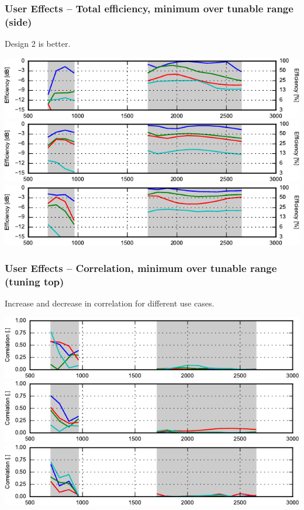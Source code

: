 \begin{frame}
    \frametitle{User Effects -- Total efficiency, minimum over tunable range (side)}
    Design 2 is better.
    \begin{center}
        \includegraphics{img/soren/ue/design1lt/effside.pdf}\\
        \includegraphics{img/soren/ue/design2sn/effside.pdf}\\
        \includegraphics{img/soren/ue/design3hv/effside.pdf}
    \end{center}
    \legendfooter
\end{frame}

\begin{frame}
    \frametitle{User Effects -- Correlation, minimum over tunable range (tuning top)}
    Increase and decrease in correlation for different use cases.
    \emptyline
    \begin{center}
        \includegraphics{img/soren/ue/design1lt/corrtop.pdf}\\
        \includegraphics{img/soren/ue/design2sn/corrtop.pdf}\\
        \includegraphics{img/soren/ue/design3hv/corrtop.pdf}
    \end{center}
    \legendfooter
\end{frame}

